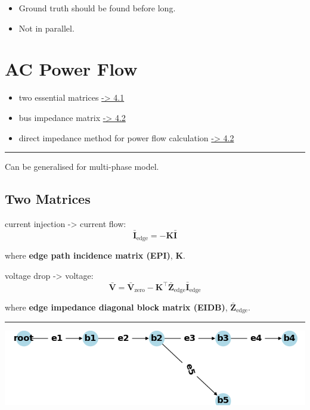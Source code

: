 \documentclass[
]{book}
\providecommand{\tightlist}{%
  \setlength{\itemsep}{0pt}\setlength{\parskip}{0pt}}
\begin{document}
\begin{itemize}
\tightlist
\item
  Ground truth should be found before long.
\item
  Not in parallel.
\end{itemize}

\hypertarget{ac-power-flow}{%
\chapter{AC Power Flow}\label{ac-power-flow}}

\begin{itemize}
\tightlist
\item
  two essential matrices \protect\hyperlink{matrices}{-\textgreater{} 4.1}
\item
  bus impedance matrix \protect\hyperlink{BIM}{-\textgreater{} 4.2}
\item
  direct impedance method for power flow calculation \protect\hyperlink{power-flow}{-\textgreater{} 4.2}
\end{itemize}

\begin{center}\rule{0.5\linewidth}{0.5pt}\end{center}

Can be generalised for multi-phase model. \citep{hsieh2017matrix}

\hypertarget{matrices}{%
\section{Two Matrices}\label{matrices}}

current injection -\textgreater{} current flow:
\[
  \bar{\boldsymbol{I}}_{\text{edge}} =
  - \boldsymbol{K} \bar{\boldsymbol{I}}
\]

where \textbf{edge path incidence matrix (EPI)}, \(\boldsymbol{K}\).

voltage drop -\textgreater{} voltage:
\[
  \bar{\boldsymbol{V}} =
  \bar{\boldsymbol{V}}_{\text{zero}}
  - \boldsymbol{K}^{\top} \boldsymbol{\bar{Z}}_\text{edge}
  \bar{\boldsymbol{I}}_{\text{edge}} 
\]

where \textbf{edge impedance diagonal block matrix (EIDB)},
\(\boldsymbol{\bar{Z}}_\text{edge}\).

\begin{center}\rule{0.5\linewidth}{0.5pt}\end{center}

\begin{center}\includegraphics[width=0.7\linewidth]{Pictures/figCaseSixRaw} \end{center}
\end{document}
